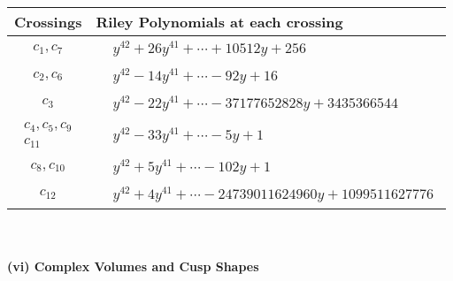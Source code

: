 \documentclass[1p]{elsarticle_modified}
\theoremstyle{definition}
\begin{document}
\begin{tabular}{m{50pt}|m{274pt}}
Crossings & \hspace{64pt}Riley Polynomials at each crossing \\
\hline $$\begin{aligned}c_{1},c_{7}\end{aligned}$$&$\begin{aligned}
&y^{42}+26 y^{41}+\cdots+10512 y+256
\end{aligned}$\\
\hline $$\begin{aligned}c_{2},c_{6}\end{aligned}$$&$\begin{aligned}
&y^{42}-14 y^{41}+\cdots-92 y+16
\end{aligned}$\\
\hline $$\begin{aligned}c_{3}\end{aligned}$$&$\begin{aligned}
&y^{42}-22 y^{41}+\cdots-37177652828 y+3435366544
\end{aligned}$\\
\hline $$\begin{aligned}c_{4},c_{5},c_{9}\\c_{11}\end{aligned}$$&$\begin{aligned}
&y^{42}-33 y^{41}+\cdots-5 y+1
\end{aligned}$\\
\hline $$\begin{aligned}c_{8},c_{10}\end{aligned}$$&$\begin{aligned}
&y^{42}+5 y^{41}+\cdots-102 y+1
\end{aligned}$\\
\hline $$\begin{aligned}c_{12}\end{aligned}$$&$\begin{aligned}
&y^{42}+4 y^{41}+\cdots-24739011624960 y+1099511627776
\end{aligned}$\\
\hline
\end{tabular}\\~\\
\newpage\flushleft \textbf{(vi) Complex Volumes and Cusp Shapes}
\end{document}
